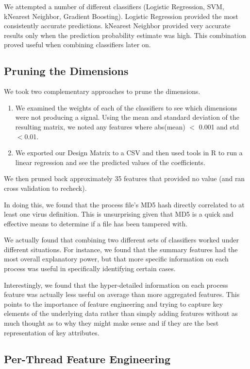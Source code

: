 \documentclass[11pt, oneside]{article}   	%
\begin{document}
We attempted a number of different classifiers (Logistic Regression, SVM, kNearest Neighbor, Gradient Boosting). Logistic Regression provided the most consistently accurate predictions. kNearest Neighbor provided very accurate results only when the prediction probability estimate was high. This combination proved useful when combining classifiers later on.

\subsection*{Pruning the Dimensions}

We took two complementary approaches to prune the dimensions.
\begin{enumerate}
  \item We examined the weights of each of the classifiers to see which dimensions were not producing a signal. Using the mean and standard deviation of the resulting matrix, we noted any features where abs(mean) $<$ 0.001 and std $< $0.01.
  \item We exported our Design Matrix to a CSV and then used tools in R to run a linear regression and see the predicted values of the coefficients. 
\end{enumerate}

We then pruned back approximately 35 features that provided no value (and ran cross validation to recheck).

In doing this, we found that the process file's MD5 hash directly correlated to at least one virus definition. This is unsurprising given that MD5 is a quick and effective means to determine if a file has been tampered with.

We actually found that combining two different sets of classifiers worked under different situations. For instance, we found that the summary features had the most overall explanatory power, but that more specific information on each process was useful in specifically identifying certain cases.

Interestingly, we found that the hyper-detailed information on each process feature was actually less useful on average than more aggregated features. This points to the importance of feature engineering and trying to capture key elements of the underlying data rather than simply adding features without as much thought as to why they might make sense and if they are the best representation of key attributes.

\subsection*{Per-Thread Feature Engineering}
\end{document}
